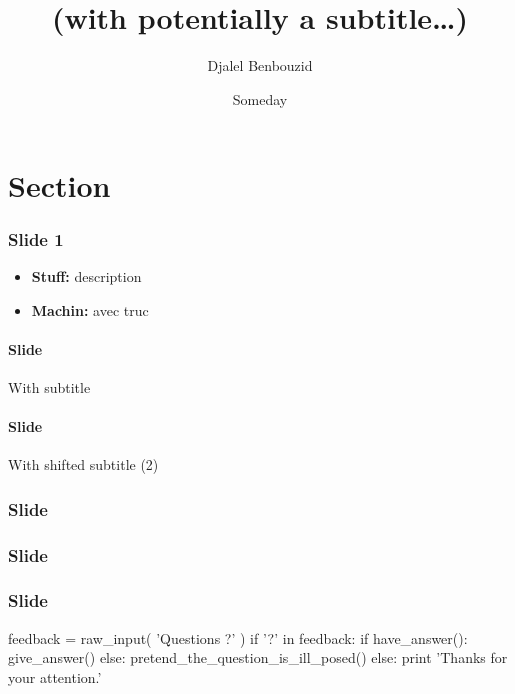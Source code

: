 \documentclass[compress,mathserif,xcolor=dvipsnames,svgnames,aspectratio=169]{beamer}
\begin{document}
\title{\selectfont{The title of the talk}\\\medskip
    \large\textcolor{beautyblue}{
    \textbf{(with potentially a subtitle\ldots)}} \medskip}
\author[{Djalel Benbouzid}]{\textcolor{grizoo}{Djalel Benbouzid}}
\date[someday\ldots]{Someday}%

\begin{frame}
\titlepage
\end{frame}

\section{Section}

\begin{frame}[c]
\frametitle{Slide 1}
\begin{itemize}
    \item \textbf{Stuff:} description 
    \item \textbf{Machin:} avec truc 
\end{itemize}
\end{frame}

\begin{frame}[c]
\framesubtitle{Slide}{With subtitle}
\blindtext
\end{frame}

\begin{frame}[c]
\framesubtitle[1cm]{Slide}{With shifted subtitle (2)}
\blindmathtrue
\blindtext
\end{frame}

\begin{frame}[c]
\frametitle[1cm]{Slide}
\blinditemize
\end{frame}

\begin{frame}[c]
\frametitle[1cm]{Slide}
\blinddescription
\end{frame}

\begin{frame}[c]
\frametitle[1cm]{Slide}
\blindenumerate
\end{frame}



\appendix
{}
\setcounter{finalframe}{\value{framenumber}}

\begin{frame} %
\begin{python}
feedback = raw_input( 'Questions ?' )
if '?' in feedback:
    if have_answer():
        give_answer()
    else:
        pretend_the_question_is_ill_posed()
else:
    print 'Thanks for your attention.'
\end{python}

\end{frame}

%         
%         

\setcounter{framenumber}{\value{finalframe}}
\end{document}
